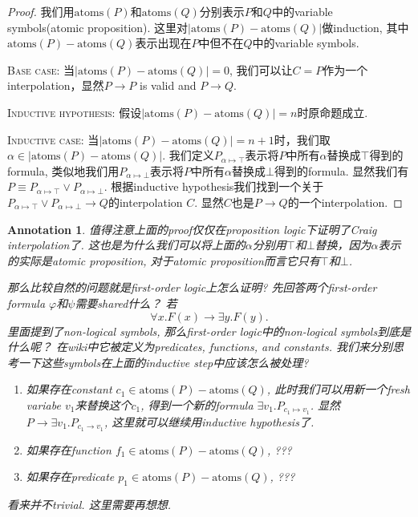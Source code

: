\documentclass{article}
\newtheorem{annotation}[theorem]{Annotation}
\begin{document}
\begin{proof}
\rm 我们用$\text{atoms}(P)$和$\text{atoms}(Q)$分别表示$P$和$Q$中的variable symbols(atomic proposition). 这里对$|\text{atoms}(P)-\text{atoms}(Q)|$做induction, 其中$\text{atoms}(P)-\text{atoms}(Q)$表示出现在$P$中但不在$Q$中的variable symbols.  

\textsc{Base case}: 当$|\text{atoms}(P)-\text{atoms}(Q)| = 0$, 我们可以让$C = P$作为一个interpolation，显然$P \to P$ is valid and $P \to Q$.

\textsc{Inductive hypothesis}: 假设$|\text{atoms}(P)-\text{atoms}(Q)| = n$时原命题成立.

\textsc{Inductive case}: 当$|\text{atoms}(P)-\text{atoms}(Q)| = n+1$时，我们取$\alpha \in |\text{atoms}(P)-\text{atoms}(Q)|$.  我们定义$P_{\alpha \mapsto \top}$表示将$P$中所有$\alpha$替换成$\top$得到的formula, 类似地我们用$P_{\alpha \mapsto \bot}$表示将$P$中所有$\alpha$替换成$\bot$得到的formula. 显然我们有$P \equiv P_{\alpha \mapsto \top} \vee P_{\alpha \mapsto \bot}$. 根据inductive hypothesis我们找到一个关于$P_{\alpha \mapsto \top} \vee P_{\alpha \mapsto \bot} \to Q$的interpolation $C$. 显然$C$也是$P \to Q$的一个interpolation.
\end{proof}

\begin{annotation}
\rm 值得注意上面的proof仅仅在proposition logic下证明了Craig interpolation了. 这也是为什么我们可以将上面的$\alpha$分别用$\top$和$\bot$替换，因为$\alpha$表示的实际是atomic proposition, 对于atomic proposition而言它只有$\top$和$\bot$.

那么比较自然的问题就是first-order logic上怎么证明? 先回答两个first-order formula $\varphi$和$\psi$需要shared什么？ 若
\[
\forall x. F(x)  \to \exists y. F(y). 
\]
\cite{CF2007}里面提到了non-logical symbols, 那么first-order logic中的non-logical symbols到底是什么呢？ 在wiki中它被定义为predicates, functions, and constants. 我们来分别思考一下这些symbols在上面的inductive step中应该怎么被处理? 
\begin{enumerate}
	\item 如果存在constant $c_1 \in \text{atoms}(P)-\text{atoms}(Q)$, 此时我们可以用新一个fresh variabe $v_1$来替换这个$c_1$, 得到一个新的formula $\exists v_1. P_{c_1 \mapsto v_1}$. 显然$P \to \exists v_1. P_{c_1 \to v_1}$, 这里就可以继续用inductive hypothesis了.
	\item 如果存在function $f_1 \in \text{atoms}(P)-\text{atoms}(Q)$, ???
	\item 如果存在predicate $p_1 \in \text{atoms}(P)-\text{atoms}(Q)$, ???
\end{enumerate}
看来并不trivial. 这里需要再想想.
\end{annotation}
\end{document}
